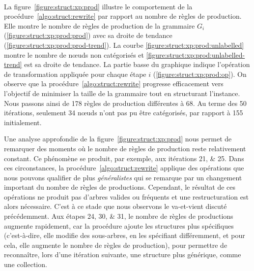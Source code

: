 \paragraph{}
La figure~\ref{figure:struct:xp:prod} illustre le comportement de la procédure~\ref{algo:struct:rewrite} par rapport au nombre de règles de production.
Elle montre le nombre de règles de production de la grammaire $G_i$ (\ref{figure:struct:xp:prod:prod}) avec sa droite de tendance (\ref{figure:struct:xp:prod:prod-trend}).
La courbe \ref{figure:struct:xp:prod:unlabelled} montre le nombre de nœuds non catégorisés et \ref{figure:struct:xp:prod:unlabelled-trend} est sa droite de tendance.
La partie basse du graphique indique l'opération de transformation appliquée pour chaque étape $i$ (\ref{figure:struct:xp:prod:op}).
On observe que la procédure~\ref{algo:struct:rewrite} progresse efficacement vers l'objectif de minimiser la taille de la grammaire tout en structurant l'instance.
Nous passons ainsi de \num{178} règles de production différentes à \num{68}.
Au terme des \num{50} itérations, seulement \num{34} nœuds n'ont pas pu être catégorisés, par rapport à \num{155} initialement.

Une analyse approfondie de la figure~\ref{figure:struct:xp:prod} nous permet de remarquer des moments où le nombre de règles de production reste relativement constant.
Ce phénomène se produit, par exemple, aux itérations \numlist{21;25}.
Dans ces circonstances, la procédure~\ref{algo:struct:rewrite} applique des opérations que nous pouvons qualifier de plus \emph{généralistes} qui se remarque par un changement important du nombre de règles de productions.
Cependant, le résultat de ces opérations ne produit pas d'arbres valides ou fréquents et une restructuration est alors nécessaire.
C'est à ce stade que nous observons le va-et-vient discuté précédemment.
Aux étapes \numlist{24;30;31}, le nombre de règles de productions augmente rapidement, car la procédure ajoute les structures plus spécifiques (c'est-à-dire, elle modifie des sous-arbres, en les spécifiant différemment, et pour cela, elle augmente le nombre de règles de production), pour permettre de reconnaître, lors d'une itération suivante, une structure plus générique, comme une collection.

